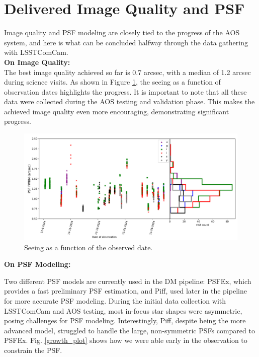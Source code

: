 \section{Delivered Image Quality and PSF}
\label{sec:delivered_image_quality_and_psf}


Image quality and PSF modeling are closely tied to the progress of the AOS system, and here is what can be concluded halfway through the data gathering with LSSTComCam. \\

\textbf{On Image Quality:} \\

The best image quality achieved so far is 0.7 arcsec, with a median of 1.2 arcsec during science visits. As shown in Figure \ref{seeing_plot}, the seeing as a function of observation dates highlights the progress. It is important to note that all these data were collected during the AOS testing and validation phase. This makes the achieved image quality even more encouraging, demonstrating significant progress.

\begin{figure}
        \centering
        \includegraphics[width=\textwidth]{figures/seeing}
        \caption{\small Seeing as a function of the observed date.}
        \label{seeing_plot}
\end{figure}


\textbf{On PSF Modeling:}

Two different PSF models are currently used in the DM pipeline: PSFEx, which provides a fast preliminary PSF estimation, and Piff, used later in the pipeline for more accurate PSF modeling. During the initial data collection with LSSTComCam and AOS testing, most in-focus star shapes were asymmetric, posing challenges for PSF modeling. Interestingly, Piff, despite being the more advanced model, struggled to handle the large, non-symmetric PSFs compared to PSFEx. Fig. \ref{growth_plot} shows how we were able early in the observation to constrain the PSF.


